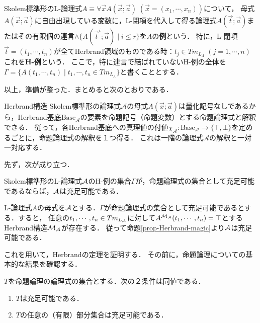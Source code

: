 \documentclass[uplatex,dvipdfmx]{jsarticle}
\begin{document}
\begin{definition}[H-instance]
    Skolem標準形のL-論理式$A\equiv \forall\vec{x}A(\vec{x};\vec{a})\;(\vec{x}=(x_1,\cdots,x_n))$について，
    母式$A(\vec{x};\vec{a})$に自由出現している変数に，L-閉項を代入して得る論理式$A(\vec{t};\vec{a})$またはその有限個の連言$\land\{A(\vec{t}^i;\vec{a})\mid i\le r\}$を$A$の\textbf{例}という．
    特に，L-閉項$\vec{t}=(t_1,\cdots,t_n)$が全てHerbrand領域のものである時：$t_j\in Tm_{L_A}\;(j=1,\cdots,n)$これを\textbf{H-例}という．
    ここで，特に連言で結ばれていないH-例の全体を$\Gamma=\{A(t_1,\cdots,t_n)\mid t_1,\cdots,t_n\in Tm_{L_A}\}$と書くこととする．
\end{definition}

以上，準備が整った．まとめると次のとおりである．
\begin{itembox}[l]{Herbrand構造}
    Skolem標準形の論理式$\mathcal{A}$の母式$A(\vec{x};\vec{a})$は量化記号なしであるから，Herbrand基底$\mathrm{Base}_\mathcal{A}$の要素を命題記号（命題変数）とする命題論理式と解釈できる．
    従って，各Herbrand基底への真理値の付値$\chi_\mathcal{A}:\mathrm{Base}_\mathcal{A}\to\{\top,\bot\}$を定めるごとに，命題論理式の解釈を１つ得る．
    これは一階の論理式$\mathcal{A}$の解釈と一対一対応する．
\end{itembox}

先ず，次が成り立つ．
\begin{lemma}\label{lemma-Herbrand-first-and-zero}
    Skolem標準形のL-論理式$\mathcal{A}$のH-例の集合$\Gamma$が，命題論理式の集合として充足可能であるならば，$\mathcal{A}$は充足可能である．
\end{lemma}
\begin{remark}
    L-論理式$A$の母式を$\mathcal{A}$とする．$\Gamma$が命題論理式の集合として充足可能であるとする．すると，
    任意の$t_1,\cdots,t_n\in Tm_{L_{\mathcal{A}}}$に対して$A^{\mathcal{M}_{\mathcal{A}}}(t_1,\cdots,t_n)=\top$とするHerbrand構造$\mathcal{M}_{\mathcal{A}}$が存在する．
    従って命題\ref{prop-Herbrand-magic}より$\mathcal{A}$は充足可能である．
\end{remark}

これを用いて，Herbrandの定理を証明する．
その前に，命題論理についての基本的な結果を確認する．
\begin{theorem}[命題論理のコンパクト性定理]
    $T$を命題論理の論理式の集合とする．次の２条件は同値である．
    \begin{enumerate}
        \item $T$は充足可能である．
        \item $T$の任意の（有限）部分集合は充足可能である．
    \end{enumerate}
\end{theorem}
\end{document}
